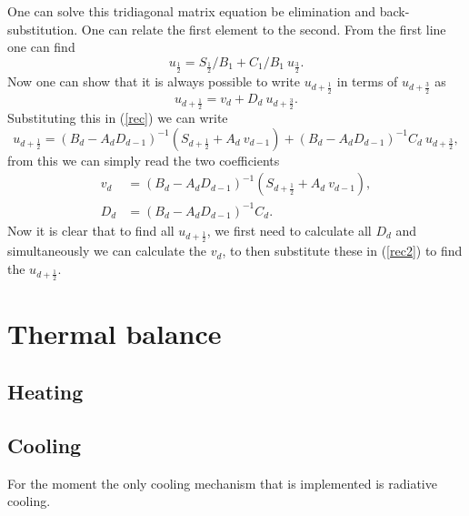 \documentclass[]{article}
\begin{document}
One can solve this tridiagonal matrix equation be elimination and back-substitution. One can relate the first element to the second. From the first line one can find
\begin{equation}
u_{\frac{1}{2}} = S_{\frac{1}{2}} / B_{1} + C_{1}/B_{1} \ u_{\frac{3}{2}} .
\end{equation}
Now one can show that it is always possible to write $u_{d+\frac{1}{2}}$ in terms of $u_{d+\frac{3}{2}}$ as
\begin{equation}
u_{d+\frac{1}{2}} = v_{d} + D_{d} \ u_{d+\frac{3}{2}}  .
\end{equation}
Substituting this in (\ref{rec}) we can write
\begin{equation}
u_{d+\frac{1}{2}} = \left( B_{d} - A_{d} D_{d-1} \right)^{-1} \left( S_{d+\frac{1}{2}} + A_{d} \ v_{d-1} \right)   + \left( B_{d} - A_{d} D_{d-1} \right)^{-1} C_{d}  \ u_{d+\frac{3}{2}}  ,
\label{rec2}
\end{equation}
from this we can simply read the two coefficients
\begin{equation}
\begin{split}
v_{d} &= \left( B_{d} - A_{d} D_{d-1} \right)^{-1} \left( S_{d+\frac{1}{2}} + A_{d} \ v_{d-1} \right), \\
D_{d} &= \left( B_{d} - A_{d} D_{d-1} \right)^{-1} C_{d} .
\end{split}
\end{equation}
Now it is clear that to find all $u_{d+\frac{1}{2}}$, we first need to calculate all $D_{d}$ and simultaneously we can calculate the $v_{d}$, to then substitute these in (\ref{rec2}) to find the $u_{d+\frac{1}{2}}$.



\section{Thermal balance}

\subsection{Heating}



\subsection{Cooling}

For the moment the only cooling mechanism that is implemented is radiative cooling.
\end{document}

